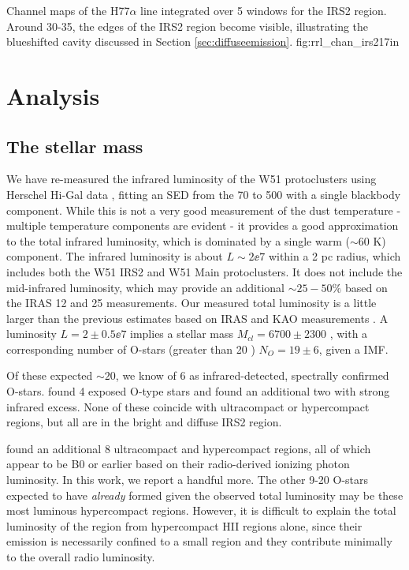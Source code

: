 {Channel maps of the H77$\alpha$ line integrated over 5 \kms windows
for the IRS2 region.  Around 30-35\kms, the edges of the IRS2 region become
visible, illustrating the blueshifted cavity discussed in Section
\ref{sec:diffuseemission}.}
{fig:rrl_chan_irs2}{1}{7in}

\section{Analysis}
\subsection{The stellar mass}
\label{sec:stellarmass}

We have re-measured the infrared luminosity of the W51 protoclusters using Herschel
Hi-Gal data \citep{Molinari2010a,Traficante2011a}, fitting an SED from the 70
to 500 \um with a single blackbody component.  While this is not a very good
measurement of the dust temperature - multiple temperature components are
evident \citep{Sievers1991a} - it provides a good approximation to the total
infrared luminosity, which is dominated by a single warm ($\sim60$ K) component.  The
infrared luminosity is about $L\sim2\ee{7}$ \lsun within a 2 pc radius, which includes
both the W51 IRS2 and W51 Main protoclusters.  It does not include the
mid-infrared luminosity, which may provide an additional $\sim25-50\%$ based on
the IRAS 12 and 25 \um measurements.  Our measured total luminosity is a little
larger than the previous estimates based on IRAS and KAO measurements
\citep{Harvey1986a,Sievers1991a}.  A luminosity $L=2\pm0.5\ee{7}$ \lsun implies
a stellar mass $M_{cl} = 6700 \pm 2300$ \msun, with a corresponding number of
O-stars (greater than 20 \msun) $N_O = 19 \pm 6$, given a \citet{Kroupa2001a} IMF.

Of these expected $\sim20$, we know of 6 as infrared-detected, spectrally
confirmed O-stars.  \citet{Figueredo2008a} found 4 exposed O-type stars and
\citet{Barbosa2008a} found an additional two with strong infrared excess.  None
of these coincide with ultracompact or hypercompact \hii regions, but all are
in the bright and diffuse IRS2 region.

\citet{Mehringer1994a} found an additional 8 ultracompact and hypercompact \hii
regions, all of which appear to be B0 or earlier based on their radio-derived
ionizing photon luminosity.  In this work, we report a handful more.
The other 9-20 O-stars expected to have \emph{already} formed given the
observed total luminosity may be these most luminous hypercompact \hii regions.
However, it is difficult to explain the total luminosity of the region from
hypercompact HII regions alone, since their emission is necessarily confined to
a small region and they contribute minimally to the overall radio luminosity.

